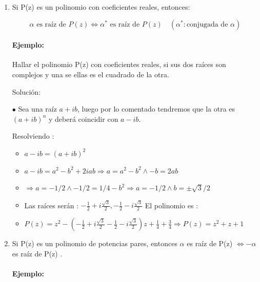 \documentclass[a4paper,12pt]{article}
\begin{document}
\begin{enumerate}
    \item Si P(z) es un polinomio con coeficientes reales, entonces:

\[
\alpha  \text{ es raíz de }  P(z) \Leftrightarrow \alpha^* \text{ es raíz  de } P(z) \quad (\alpha^*: \text{conjugada de } \alpha)
\]

\paragraph{Ejemplo:}

Hallar el polinomio P(z) con coeficientes reales, si sus dos raíces son complejos y
una se ellas es el cuadrado de la otra.

Solución:

$\bullet$ Sea una raíz $a + ib$, luego por lo comentado tendremos que la otra es $(a + ib)^n$ y
deberá coincidir con $a - ib$.





Resolviendo :

\begin{itemize}
    \item $a - ib = (a + ib)^2$
    
    \item $a - ib = a^2 - b^2 + 2iab \Rightarrow a = a^2 - b^2 \wedge -b = 2ab$
    
    \item $\Rightarrow a = -1/2 \wedge -1/2 = 1/4 - b^2 \Rightarrow a = -1/2 \wedge b = \pm \sqrt{3}/2$
    
    \item Las raíces serán : $-\frac{1}{2} + i \frac{\sqrt{3}}{2}, -\frac{1}{2} - i \frac{\sqrt{3}}{2}$ El polinomio es :
    
    \item $P(z) = z^2 - \left(-\frac{1}{2} + i \frac{\sqrt{3}}{2} - \frac{1}{2} - i \frac{\sqrt{3}}{2}\right)z + \frac{1}{4} + \frac{3}{4} \Rightarrow P(z) = z^2 + z + 1$
\end{itemize}

    \item Si P(z) es un polinomio de potencias pares, entonces $\alpha$ es raíz de P(z)
$\Leftrightarrow -\alpha$ es raíz de P(z) .

\paragraph{Ejemplo:}


\end{enumerate}
\end{document}
